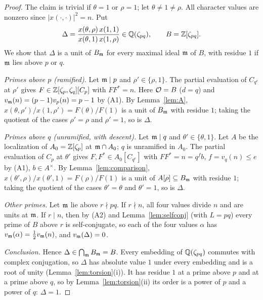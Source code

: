 \begin{proof}
The claim is trivial if $\theta=1$ or $\rho=1$; let $\theta\ne1\ne\rho$.
All character values are nonzero since $|x(\cdot,\cdot)|^2=n$. Put
\[
 \Delta=\frac{x(\theta,\rho)\,x(1,1)}{x(\theta,1)\,x(1,\rho)}\in
 \mathbb{Q}(\zeta_{pq}),\qquad B=\mathbb{Z}[\zeta_{pq}].
\]
We show that $\Delta$ is a unit of $B_{\mathfrak{m}}$ for every maximal ideal $\mathfrak{m}$ of
$B$, with residue $1$ if $\mathfrak{m}$ lies above $p$ or $q$.

\emph{Primes above $p$ (ramified).} Let $\mathfrak{m}\mid p$ and
$\rho'\in\{\rho,1\}$. The partial evaluation of $C_{q^e}$ at $\rho'$
gives $F\in\mathbb{Z}[\zeta_p,\zeta_q][C_p]$ with $FF^*=n$. Here $\mathcal{O}=B$ ($d=q$)
and $v_{\mathfrak{m}}(n)=(p-1)v_p(n)=p-1$ by (A1). By Lemma~\ref{lem:A},
$x(\theta,\rho')/x(1,\rho')=F(\theta)/F(1)$ is a unit of $B_{\mathfrak{m}}$ with
residue $1$; taking the quotient of the cases $\rho'=\rho$ and $\rho'=1$,
so is $\Delta$.

\emph{Primes above $q$ (unramified, with descent).} Let $\mathfrak{m}\mid q$ and
$\theta'\in\{\theta,1\}$. Let $A$ be the localization of
$A_0=\mathbb{Z}[\zeta_p]$ at $\mathfrak{m}\cap A_0$; $q$ is unramified in $A_0$. The
partial evaluation of $C_p$ at $\theta'$ gives $F,F^*\in A_0[C_{q^e}]$
with $FF^*=n=q^fb$, $f=v_q(n)\le e$ by (A1), $b\in A^\times$. By
Lemma~\ref{lem:comparison}, $x(\theta',\rho)/x(\theta',1)=F(\rho)/F(1)$
is a unit of $A[\rho]\subseteq B_{\mathfrak{m}}$ with residue $1$; taking the
quotient of the cases $\theta'=\theta$ and $\theta'=1$, so is $\Delta$.

\emph{Other primes.} Let $\mathfrak{m}$ lie above $r\nmid pq$. If $r\nmid n$, all
four values divide $n$ and are units at $\mathfrak{m}$. If $r\mid n$, then by (A2)
and Lemma~\ref{lem:selfconj} (with $L=pq$) every prime of $B$ above $r$
is self-conjugate, so each of the four values $\alpha$ has
$v_{\mathfrak{m}}(\alpha)=\frac12v_{\mathfrak{m}}(n)$, and $v_{\mathfrak{m}}(\Delta)=0$.

\emph{Conclusion.} Hence $\Delta\in\bigcap_{\mathfrak{m}} B_{\mathfrak{m}}=B$. Every embedding of
$\mathbb{Q}(\zeta_{pq})$ commutes with complex conjugation, so $\Delta$ has
absolute value $1$ under every embedding and is a root of unity
(Lemma~\ref{lem:torsion}(i)). It has residue $1$ at a prime above $p$
and at a prime above $q$, so by Lemma~\ref{lem:torsion}(ii) its order is
a power of $p$ and a power of $q$: $\Delta=1$.
\end{proof}

